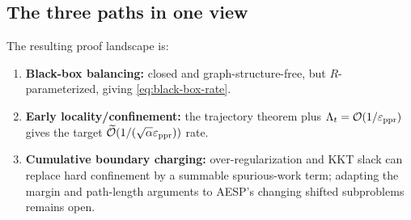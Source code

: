\subsection{The three paths in one view}

The resulting proof landscape is:
\begin{enumerate}[leftmargin=2em]
  \item \textbf{Black-box balancing:} closed and graph-structure-free, but
        $R$-parameterized, giving \cref{eq:black-box-rate}.
  \item \textbf{Early locality/confinement:} the trajectory theorem plus
        $\Lambda_t=\mathcal O(1/\varepsilon_{\mathrm{ppr}})$ gives the target
        $\widetilde{\mathcal O}(1/(\sqrt\alpha\varepsilon_{\mathrm{ppr}}))$ rate.
  \item \textbf{Cumulative boundary charging:} over-regularization and KKT
        slack can replace hard confinement by a summable spurious-work term;
        adapting the margin and path-length arguments to AESP's changing
        shifted subproblems remains open.
\end{enumerate}
